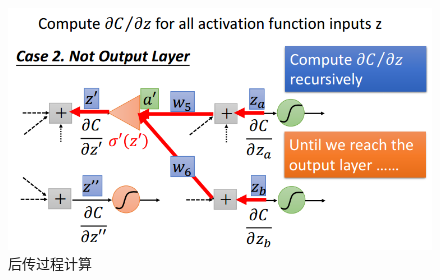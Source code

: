 \begin{figure}[htb]
	\includegraphics[scale=0.4]{pic/backwardpass_05}
	\caption{后传过程计算}
	\label{fig:backwardpass}
\end{figure}
\clearpage